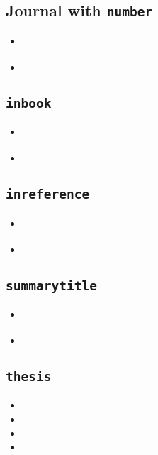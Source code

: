 \documentclass[a4paper,12pt]{scrartcl}
\newcommand{\Typ}[1]{\texttt{\symbol{64}#1}}
\newcommand{\Feld}[1]{\texttt{#1}}
\begin{document}
\subsection{Journal with \Feld{number}}
\begin{itemize}
	\item\cite{ib:2016a}%
	\item{}%
\end{itemize}

\subsection{\Typ{inbook}}
\begin{itemize}
	\item\cites{boppert:1998}%
    \item{}%
\end{itemize}


\subsection{\Typ{inreference}}
\begin{itemize}
	\item\cite{bauchhenss:et:al:1978}%
	\item{}%
\end{itemize}

\subsection{\Feld{summarytitle}}
\begin{itemize}
	\item\cite{ilinskaja:1965}%
	\item{}%
\end{itemize}

\subsection{\Typ{thesis}}
\begin{itemize}
    \item{}%
    \item{}%
    \item{}%
    \item{}%
\end{itemize}
\end{document}
